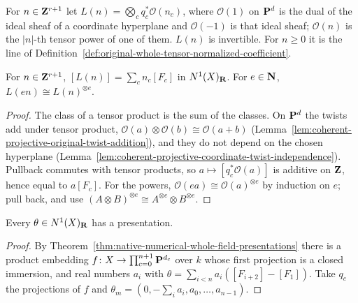 \begin{definition}
\label{def:pm-signed-line}
\leanok
{}
For $n\in\mathbf{Z}^{r+1}$ let $L(n)=\bigotimes_cq_c^*\mathcal O(n_c)$, where $\mathcal O(1)$ on
$\mathbf{P}^{d}$ is the dual of the ideal sheaf of a coordinate hyperplane and $\mathcal O(-1)$ is that
ideal sheaf; $\mathcal O(n)$ is the $|n|$-th tensor power of one of them. $L(n)$ is invertible.
For $n\ge0$ it is the line of Definition~\ref{def:original-whole-tensor-normalized-coefficient}.
\end{definition}

\begin{lemma}
\label{lem:pm-line-class}
\leanok
{}
For $n\in\mathbf{Z}^{r+1}$, $[L(n)]=\sum_cn_c[F_c]$ in $N^1(X)_{\mathbf{R}}$. For $e\in\mathbf{N}$,
$L(en)\cong L(n)^{\otimes e}$.
\end{lemma}
\begin{proof}
\leanok
The class of a tensor product is the sum of the classes. On $\mathbf{P}^d$ the twists add under
tensor product, $\mathcal O(a)\otimes\mathcal O(b)\cong\mathcal O(a+b)$
(Lemma~\ref{lem:coherent-projective-original-twist-addition}), and they do not depend on the
chosen hyperplane (Lemma~\ref{lem:coherent-projective-coordinate-twist-independence}). Pullback
commutes with tensor products, so $a\mapsto[q_c^*\mathcal O(a)]$ is additive on $\mathbf{Z}$, hence equal
to $a[F_c]$. For the powers, $\mathcal O(ea)\cong\mathcal O(a)^{\otimes e}$ by induction on $e$;
pull back, and use $(A\otimes B)^{\otimes e}\cong A^{\otimes e}\otimes B^{\otimes e}$.
\end{proof}

\begin{lemma}
\label{lem:pm-exists-presentation}
\leanok
{}
Every $\theta\in N^1(X)_{\mathbf{R}}$ has a presentation.
\end{lemma}
\begin{proof}
\leanok
By Theorem~\ref{thm:native-numerical-whole-field-presentations} there is a product embedding
$f\colon X\to\prod_{c=0}^{n+1}\mathbf{P}^{d_c}$ over $k$ whose first projection is a closed immersion,
and real numbers $a_i$ with $\theta=\sum_{i<n}a_i([F_{i+2}]-[F_1])$. Take $q_c$ the projections
of $f$ and $\theta_m=(0,-\sum_ia_i,a_0,\dots,a_{n-1})$.
\end{proof}

